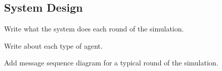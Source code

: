 \subsection{System Design}

Write what the system does each round of the simulation.

Write about each type of agent.

Add message sequence diagram for a typical round of the simulation.
